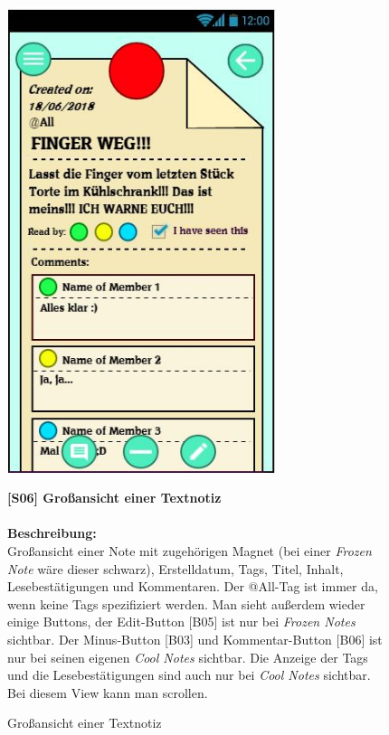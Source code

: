 \documentclass[a4paper]{scrreprt}
\begin{document}
    	\begin{figure}[h]
    		\begin{minipage}[b]{0.4\linewidth}
    			
    			\flushright
    			\centering
    			\includegraphics[width=0.7\textwidth]{fridget_notebig.JPG}
    			\caption{Großansicht einer Textnotiz}
    			\label{fig:figure1}
    			\vspace{13cm}
    		\end{minipage}
    		\hspace{0.5cm}
    		\begin{minipage}[b]{0.55\linewidth}
    			\flushleft
    			\textbf{{[}S06{]} Großansicht einer Textnotiz} \\
    			\hfill
    			\\\textbf{Beschreibung:} \\
    			Großansicht einer Note mit zugehörigen Magnet  (bei einer \textit{Frozen Note} wäre dieser schwarz), Erstelldatum, Tags, Titel, Inhalt, Lesebestätigungen und Kommentaren. Der @All-Tag ist immer da, wenn keine Tags spezifiziert werden. Man sieht außerdem wieder einige Buttons, der Edit-Button {[}B05{]} ist nur bei \textit{Frozen Notes} sichtbar. Der Minus-Button {[}B03{]}  und Kommentar-Button {[}B06{]} ist nur bei seinen eigenen \textit{Cool Notes} sichtbar. Die Anzeige der Tags und die Lesebestätigungen sind auch nur bei \textit{Cool Notes} sichtbar. Bei diesem View kann man scrollen.

\end{minipage}
\end{figure}
\end{document}
